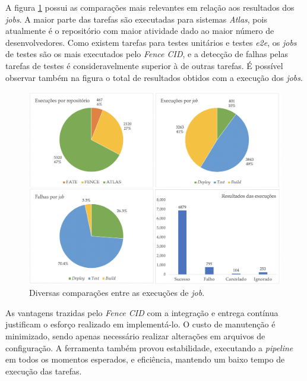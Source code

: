 A figura \ref{fig:testes-resultados} possui as comparações mais relevantes em relação aos resultados dos \emph{jobs}. A maior parte das tarefas são executadas para sistemas \emph{Atlas}, pois atualmente é o repositório com maior atividade dado ao maior número de desenvolvedores. Como existem tarefas para testes unitários e testes \emph{e2e}, os \emph{jobs} de testes são os mais executados pelo \emph{Fence CID}, e a detecção de falhas pelas tarefas de testes é consideravelmente superior à de outras tarefas. É possível observar também na figura o total de resultados obtidos com a execução dos \emph{jobs}.

\begin{figure}[H]
    \centering
    \includegraphics[width=15cm]{source/5-resultados/images/testes-resultados.png}
    \caption{Diversas comparações entre as execuções de \emph{job}.}
    \label{fig:testes-resultados}
\end{figure}

As vantagens trazidas pelo \emph{Fence CID} com a integração e entrega contínua justificam o esforço realizado em implementá-lo. O custo de manutenção é minimizado, sendo apenas necessário realizar alterações em arquivos de configuração. A ferramenta também provou estabilidade, executando a \emph{pipeline} em todos os momentos esperados, e eficiência, mantendo um baixo tempo de execução das tarefas.
